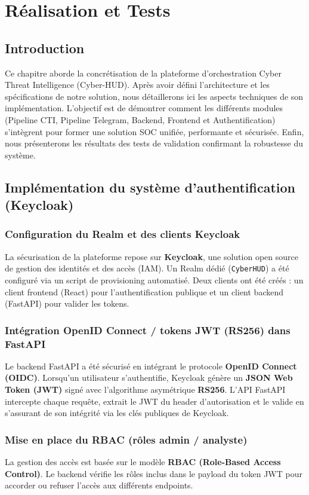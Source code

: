 \chapter{Réalisation et Tests}

\section{Introduction}
Ce chapitre aborde la concrétisation de la plateforme d'orchestration Cyber Threat Intelligence (Cyber-HUD). Après avoir défini l'architecture et les spécifications de notre solution, nous détaillerons ici les aspects techniques de son implémentation. L'objectif est de démontrer comment les différents modules (Pipeline CTI, Pipeline Telegram, Backend, Frontend et Authentification) s'intègrent pour former une solution SOC unifiée, performante et sécurisée. Enfin, nous présenterons les résultats des tests de validation confirmant la robustesse du système.

\section{Implémentation du système d'authentification (Keycloak)}

\subsection{Configuration du Realm et des clients Keycloak}
La sécurisation de la plateforme repose sur \textbf{Keycloak}, une solution open source de gestion des identités et des accès (IAM). Un Realm dédié (\texttt{CyberHUD}) a été configuré via un script de provisioning automatisé. Deux clients ont été créés : un client frontend (React) pour l'authentification publique et un client backend (FastAPI) pour valider les tokens.

\subsection{Intégration OpenID Connect / tokens JWT (RS256) dans FastAPI}
Le backend FastAPI a été sécurisé en intégrant le protocole \textbf{OpenID Connect (OIDC)}. Lorsqu'un utilisateur s'authentifie, Keycloak génère un \textbf{JSON Web Token (JWT)} signé avec l'algorithme asymétrique \textbf{RS256}. L'API FastAPI intercepte chaque requête, extrait le JWT du header d'autorisation et le valide en s'assurant de son intégrité via les clés publiques de Keycloak.

\subsection{Mise en place du RBAC (rôles admin / analyste)}
La gestion des accès est basée sur le modèle \textbf{RBAC (Role-Based Access Control)}. Le backend vérifie les rôles inclus dans le payload du token JWT pour accorder ou refuser l'accès aux différents endpoints.

